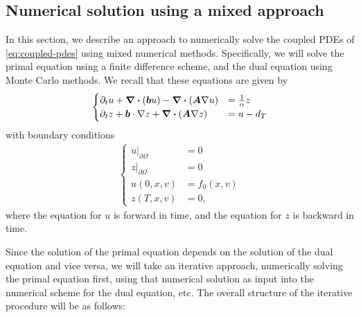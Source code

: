 \documentclass{article}  %
\begin{document}
\subsection{Numerical solution using a mixed approach}







In this section, we describe an approach to numerically solve the coupled PDEs of \autoref{eq:coupled-pdes} using mixed numerical methods. Specifically, we will solve the primal equation using a finite difference scheme, and the dual equation using Monte Carlo methods. We recall that these equations are given by 
%
\begin{align} 
    \begin{cases} 
        \partial_t u + \div{(\boldsymbol{b}u)} - \div{(\boldsymbol{A} \nabla u)} &= \frac{1}{\alpha} z\\
        \partial_t z + \boldsymbol{b} \cdot \nabla z + \div{(\boldsymbol{A} \nabla z)} &= u - d_T
    \end{cases}
\end{align}
%
with boundary conditions 
%
\begin{align}
    \begin{cases} 
        {u \rvert}_{\partial \Omega} &= 0\\
        {z \rvert}_{\partial \Omega} &= 0\\
        u(0,x,v) &= f_0(x,v)\\
        z(T,x,v) &= 0,
    \end{cases} 
\end{align}
%
where the equation for $u$ is forward in time, and the equation for $z$ is backward in time. 

Since the solution of the primal equation depends on the solution of the dual equation and vice versa, we will take an iterative approach, numerically solving the primal equation first, using that numerical solution as input into the numerical scheme for the dual equation, etc. The overall structure of the iterative procedure will be as follows:
\end{document}

